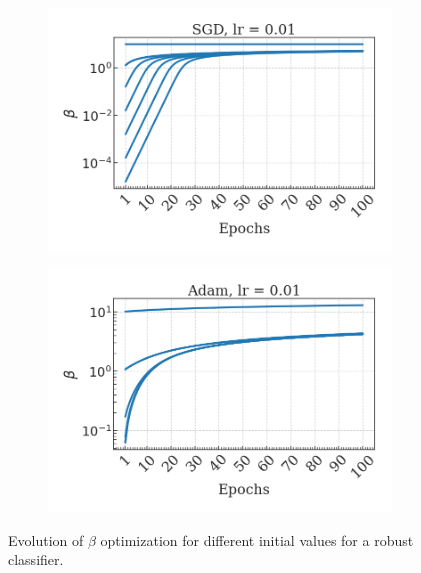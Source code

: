 \begin{figure}[H]
    \centering
    \begin{subfigure}[b]{0.45\textwidth}
        \centering
        \includegraphics[width=\textwidth]{img/results_discussion/empirical/rob_met=betas_hue=beta0_opt=sgd_lr=0.01.png}
    \end{subfigure}
    \hfill
    \begin{subfigure}[b]{0.45\textwidth}
        \centering
        \includegraphics[width=\textwidth]{img/results_discussion/empirical/rob_met=betas_hue=beta0_opt=adam_lr=0.01.png}
    \end{subfigure}
    \caption{Evolution of $\beta$ optimization for different initial values for a robust classifier.}
\end{figure}



